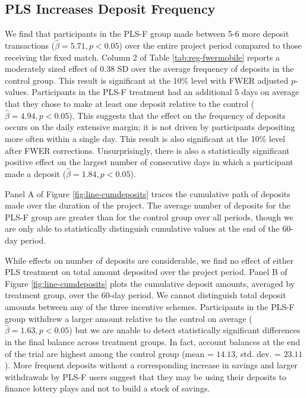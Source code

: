 \documentclass[11pt]{article}
\begin{document}
	

	\subsection{PLS Increases Deposit Frequency}

		We find that participants in the PLS-F group made between 5-6 more deposit transactions ($\hat \beta = 5.71, p < 0.05$) over the entire project period compared to those receiving the fixed match. Column 2 of Table \ref{tab:reg-fwermobile} reports a moderately sized effect of 0.38 SD over the average frequency of deposits in the control group. This result is significant at the 10\% level with FWER adjusted $p$-values. Participants in the PLS-F treatment had an additional 5 days on average that they chose to make at least one deposit relative to the control ($\hat \beta = 4.94, p < 0.05$). This suggests that the effect on the frequency of deposits occurs on the daily extensive margin; it is not driven by participants depositing more often within a single day. This result is also significant at the 10\% level after FWER corrections. Unsurprisingly, there is also a statistically significant positive effect on the largest number of consecutive days in which a participant made a deposit ($\hat \beta = 1.84, p < 0.05$).

		Panel A of Figure \ref{fig:line-cumdeposits} traces the cumulative path of deposits made over the duration of the project. The average number of deposits for the PLS-F group are greater than for the control group over all periods, though we are only able to statistically distinguish cumulative values at the end of the 60-day period.

		While effects on number of deposits are considerable, we find no effect of either PLS treatment on total amount deposited over the project period. Panel B of Figure \ref{fig:line-cumdeposits} plots the cumulative deposit amounts, averaged by treatment group, over the 60-day period. We cannot distinguish total deposit amounts between any of the three incentive schemes. Participants in the PLS-F group withdrew a larger amount relative to the control on average ($\hat \beta = 1.63, p < 0.05$) but we are unable to detect statistically significant differences in the final balance across treatment groups. In fact, account balances at the end of the trial are highest among the control group (mean = $14.13$, std. dev. = $23.11$). More frequent deposits without a corresponding increase in savings and larger withdrawals by PLS-F users suggest that they may be using their deposits to finance lottery plays and not to build a stock of savings.
\end{document}
